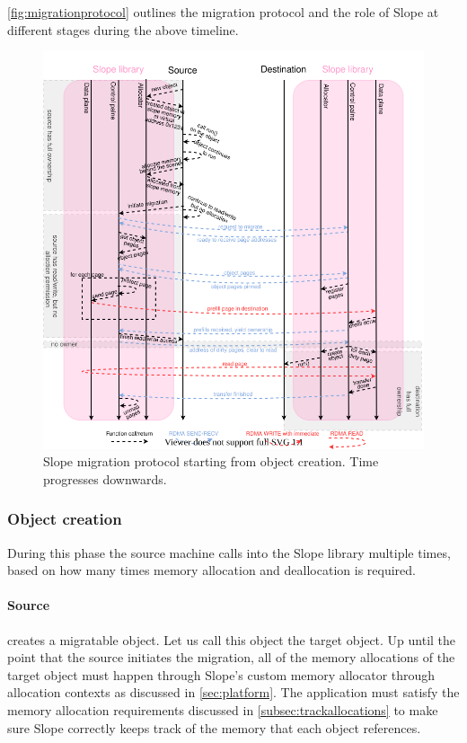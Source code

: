 \autoref{fig:migrationprotocol} outlines the migration protocol and the role
of Slope at different stages during the above timeline.

\begin{figure}[tp]
\centering

\includegraphics[width=1\textwidth]{migration-protocol.drawio}
\caption{
    Slope migration protocol starting from object creation. Time progresses
    downwards.
}
\label{fig:migrationprotocol}
\end{figure}

\subsubsection{Object creation}
During this phase the source machine calls into the Slope library multiple
times, based on how many times memory allocation and deallocation is required.

\paragraph{Source} creates a migratable object. Let us call this object
the target object. Up until the point that
the source initiates the migration, all of the memory allocations of the target object
must happen through
Slope's custom memory allocator through allocation contexts as discussed in
 \autoref{sec:platform}.
The application must satisfy the memory allocation requirements discussed in
\autoref{subsec:trackallocations} to make sure Slope correctly keeps track of the
memory that each object references. 

